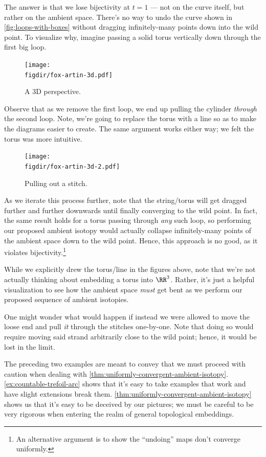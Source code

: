 \begin{example}
  The answer is that we lose bijectivity at $t = 1$ --- not on the
  curve itself, but rather on the ambient space. There's no way to
  undo the curve shown in \cref{fig:loops-with-boxes} without
  dragging infinitely-many points down into the wild point. To
  visualize why, imagine passing a solid torus vertically down
  through the first big loop.
  \begin{figure}[H]
    \centering
    \texttt{[image: \\figdir/fox-artin-3d.pdf]}
    \caption{A 3D perspective.}
    \label{fig:fox-artin-3d-torus}
  \end{figure}
  Observe that as we remove the first loop, we end up pulling the
  cylinder \emph{through} the second loop. Note, we're going to
  replace the torus with a line so as to make the diagrams easier to
  create. The same argument works either way; we felt the torus was
  more intuitive.
  \begin{figure}[H]
    \centering
    \texttt{[image: \\figdir/fox-artin-3d-2.pdf]}
    \caption{Pulling out a stitch.}
    \label{fig:fox-artin-pulling-out-a-stitch}
  \end{figure}
  As we iterate this process further, note that the string/torus will
  get dragged further and further downwards until finally converging
  to the wild point. In fact, the same result holds for a torus
  passing through \emph{any} such loop, so performing our proposed
  ambient isotopy would actually collapse infinitely-many points of
  the ambient space down to the wild point. Hence, this approach is no
  good, as it violates bijectivity.\footnote{An alternative argument
    is to show the ``undoing'' maps don't converge uniformly.}
\end{example}
\begin{note}
  While we explicitly drew the torus/line in the figures above, note
  that we're not actually thinking about embedding a torus into
  $\RR^3$. Rather, it's just a helpful visualization to see how the
  ambient space \emph{must} get bent as we perform our proposed
  sequence of ambient isotopies.
\end{note}
\begin{remark}
  One might wonder what would happen if instead we were allowed to
  move the loose end and pull \emph{it} through the stitches
  one-by-one. Note that doing so would require moving said strand
  arbitrarily close to the wild point; hence, it would be lost in the
  limit.
\end{remark}
The preceding two examples are meant to convey that we must proceed
with caution when dealing with
\cref{thm:uniformly-convergent-ambient-isotopy}.
\cref{ex:countable-trefoil-arc} shows that it's easy to take examples
that work and have slight extensions break them.
\cref{thm:uniformly-convergent-ambient-isotopy} shows us that it's
easy to be deceived by our pictures; we must be careful to be very
rigorous when entering the realm of general topological embeddings.

